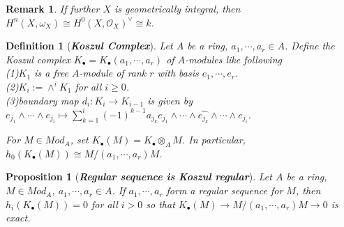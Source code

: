 \documentclass{ctexart}
\newtheorem{definition}{Definition}[section]
\newtheorem{remark}{Remark}[section]
\newtheorem{proposition}{Proposition}[section]
\begin{document}
\begin{remark}
    If further $X$ is geometrically integral, then $H^{n}(X, \omega_{X}) \cong H^{0}(X ,\mathcal{O}_{X})^{\lor} \cong k$.
\end{remark}
\begin{definition}[\textbf{\emph{Koszul Complex}}]
    Let $A$ be a ring, $a_{1}, \cdots, a_{r}\in A$.
    Define the Koszul complex $K_{\bullet} = K_{\bullet}(a_{1}, \cdots, a_{r})$ of $A$-modules like following \\
    (1)$K_{1}$ is a free $A$-module of rank $r$ with basis $e_{1}, \cdots, e_{r}$. \\
    (2)$K_{i} := \wedge^{i} K_{1}$ for all $i \ge 0$. \\
    (3)boundary map $d_{i}: K_{i} \longrightarrow K_{i - 1}$ is given by $e_{j_{1}} \wedge \cdots \wedge e_{j_{i}} \longmapsto \sum_{k = 1}^{i} (-1)^{k - 1}a_{j_{k}}e_{j_{1}} \wedge \cdots \wedge \widehat{e_{j_{k}}} \wedge \cdots \wedge e_{j_{i}}$.
    \par
    For $M\in Mod_{A}$, set $K_{\bullet}(M) = K_{\bullet} \otimes_{A} M$.
    In particular, $h_{0}(K_{\bullet}(M)) \cong M/(a_{1}, \cdots, a_{r})M$.
\end{definition}
\begin{proposition}[\textbf{\emph{Regular sequence is Koszul regular}}]
    Let $A$ be a ring, $M\in Mod_{A}$, $a_{1}, \cdots, a_{r}\in A$.
    If $a_{1}, \cdots, a_{r}$ form a regular sequence for $M$,
    then $h_{i}(K_{\bullet}(M)) = 0$ for all $i > 0$ so that $K_{\bullet}(M) \longrightarrow M/(a_{1}, \cdots, a_{r})M \longrightarrow 0$ is exact.
    \label{Proposition 11.14}
\end{proposition}
\end{document}
